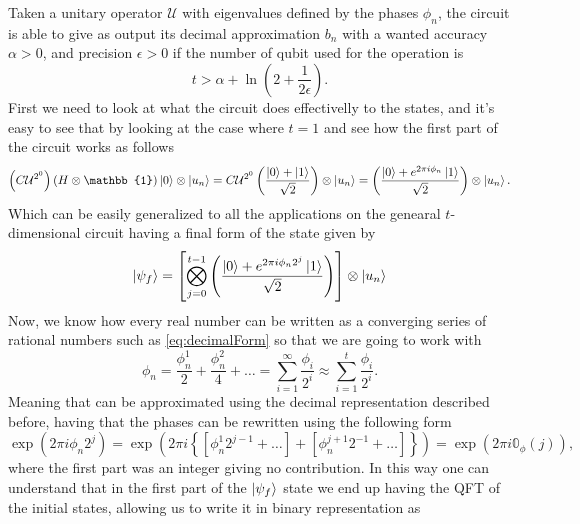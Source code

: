 {
    Taken a unitary operator $\mathcal{U}$ with eigenvalues defined by the phases $\phi_n$, the circuit  is able to give as output its decimal approximation $b_n$ with a wanted accuracy $\alpha > 0$, and precision $\epsilon > 0$ if the number of qubit used for the operation is
    \begin{equation}
        \label{eq:PhaseEvaluation}
        t > \alpha + \ln\left( 2 + \frac{1}{2\epsilon} \right).
    \end{equation}
}
{
    First we need to look at what the circuit does effectivelly to the states, and it's easy to see that by looking at the case where $t = 1$ and see how the first part of the circuit works as follows
    \begin{equation}
        \left(C\mathcal{U}^{2^0}\right)\left(H\otimes\mathbb{1}\right)\ket{0}\otimes\ket{u_n} = C\mathcal{U}^{2^0}\left( \frac{\ket{0} + \ket{1}}{\sqrt{2}} \right)\otimes\ket{u_n} = \left( \frac{\ket{0} + e^{2\pi i\phi_n}\ket{1}}{\sqrt{2}} \right)\otimes\ket{u_n}.
    \end{equation}
    Which can be easily generalized to all the applications on the genearal $t$-dimensional circuit having a final form of the state given by
    \begin{equation}
        \ket{\psi_f} = \left[\bigotimes_{j = 0}^{t-1}\left( \frac{\ket{0} + e^{2\pi i\phi_n2^j}\ket{1}}{\sqrt{2}} \right)\right]\otimes\ket{u_n}
    \end{equation}
    Now, we know how every real number can be written as a converging series of rational numbers such as \eqref{eq:decimalForm} so that we are going to work with
    \begin{equation}
        \label{eq:rationalApproxPhase}
        \phi_n = \frac{\phi_n^1}{2} + \frac{\phi_n^2}{4} + \dots = \sum_{i=1}^\infty \frac{\phi_i}{2^i} \approx \sum_{i=1}^t \frac{\phi_i}{2^i}.
    \end{equation} 
    Meaning that can be approximated using the decimal representation described before, having that the phases can be rewritten using the following form
    \begin{equation}
        \exp\left( 2\pi i \phi_n 2^j \right) = \exp\left( 2\pi i\left\{ \left[ \phi_n^1 2^{j-1} + \dots \right] + \left[ \phi_n^{j+1}2^{-1} + \dots \right] \right\} \right) = \exp\left( 2\pi i \mathbb{0}_\phi(j) \right),
    \end{equation}
    where the first part was an integer giving no contribution. In this way one can understand that in the first part of the $\ket{\psi_f}$ state we end up having the QFT of the initial states, allowing us to write it in binary representation as
}
